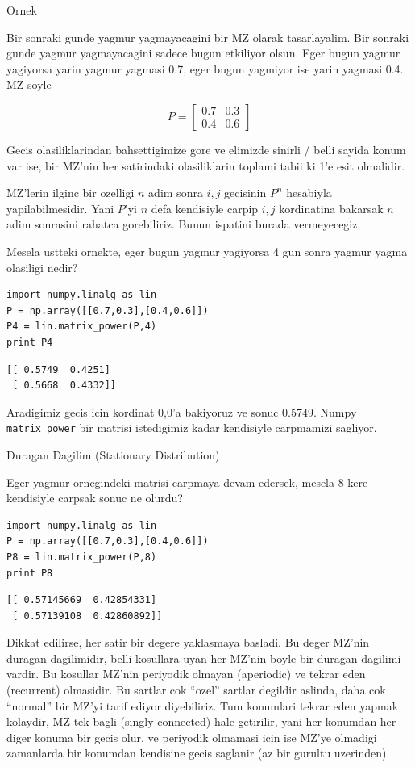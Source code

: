 \documentclass[12pt,fleqn]{article}\usepackage{../common}
\begin{document}
Ornek

Bir sonraki gunde yagmur yagmayacagini bir MZ olarak tasarlayalim. Bir
sonraki gunde yagmur yagmayacagini sadece bugun etkiliyor olsun. Eger bugun
yagmur yagiyorsa yarin yagmur yagmasi 0.7, eger bugun yagmiyor ise yarin
yagmasi 0.4. MZ soyle

$$ 
P =
\left[\begin{array}{cc}
0.7 & 0.3 \\
0.4 & 0.6
\end{array}\right]
 $$

Gecis olasiliklarindan bahsettigimize gore ve elimizde sinirli / belli
sayida konum var ise, bir MZ'nin her satirindaki olasiliklarin toplami
tabii ki 1'e esit olmalidir. 

MZ'lerin ilginc bir ozelligi $n$ adim sonra $i,j$ gecisinin $P^n$ hesabiyla
yapilabilmesidir. Yani $P$'yi $n$ defa kendisiyle carpip $i,j$ kordinatina 
bakarsak $n$ adim sonrasini rahatca gorebiliriz. Bunun ispatini burada
vermeyecegiz. 

Mesela ustteki ornekte, eger bugun yagmur yagiyorsa 4 gun sonra yagmur
yagma olasiligi nedir? 

\begin{verbatim}
import numpy.linalg as lin
P = np.array([[0.7,0.3],[0.4,0.6]])
P4 = lin.matrix_power(P,4)
print P4
\end{verbatim}

\begin{verbatim}
[[ 0.5749  0.4251]
 [ 0.5668  0.4332]]
\end{verbatim}

Aradigimiz gecis icin kordinat 0,0'a bakiyoruz ve sonuc 0.5749. Numpy
\verb!matrix_power! bir matrisi istedigimiz kadar kendisiyle carpmamizi
sagliyor. 

Duragan Dagilim (Stationary Distribution)

Eger yagmur ornegindeki matrisi carpmaya devam edersek, mesela 8 kere
kendisiyle carpsak sonuc ne olurdu? 

\begin{verbatim}
import numpy.linalg as lin
P = np.array([[0.7,0.3],[0.4,0.6]])
P8 = lin.matrix_power(P,8)
print P8
\end{verbatim}

\begin{verbatim}
[[ 0.57145669  0.42854331]
 [ 0.57139108  0.42860892]]
\end{verbatim}

Dikkat edilirse, her satir bir degere yaklasmaya basladi. Bu deger MZ'nin
duragan dagilimidir, belli kosullara uyan her MZ'nin boyle bir duragan
dagilimi vardir. Bu kosullar MZ'nin periyodik olmayan (aperiodic) ve tekrar
eden (recurrent) olmasidir. Bu sartlar cok ``ozel'' sartlar degildir
aslinda, daha cok ``normal'' bir MZ'yi tarif ediyor diyebiliriz. Tum
konumlari tekrar eden yapmak kolaydir, MZ tek bagli (singly connected) hale
getirilir, yani her konumdan her diger konuma bir gecis olur, ve periyodik
olmamasi icin ise MZ'ye olmadigi zamanlarda bir konumdan kendisine gecis
saglanir (az bir gurultu uzerinden). 
\end{document}
